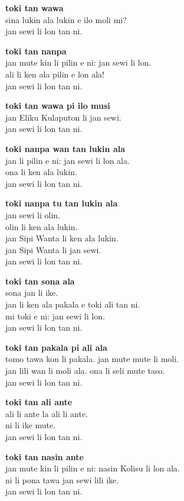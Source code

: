 \textbf{toki tan wawa}   \\
sina lukin ala lukin e ilo moli mi?   \\
jan sewi li lon tan ni.

\textbf{toki tan nanpa}   \\
jan mute kin li pilin e ni: jan sewi li lon.   \\
ali li ken ala pilin e lon ala!   \\
jan sewi li lon tan ni.

\textbf{toki tan wawa pi ilo musi}   \\
jan Eliku Kulaputon li jan sewi.   \\
jan sewi li lon tan ni.

\textbf{toki nanpa wan tan lukin ala }   \\
jan li pilin e ni: jan sewi li lon ala.   \\
ona li ken ala lukin.   \\
jan sewi li lon tan ni.

\textbf{toki nanpa tu tan lukin ala}   \\
jan sewi li olin.   \\
olin li ken ala lukin.   \\
jan Sipi Wanta li ken ala lukin.  \\
jan Sipi Wanta li jan sewi.   \\
jan sewi li lon tan ni.

\textbf{toki tan sona ala}   \\
sona jan li ike.   \\
jan li ken ala pakala e toki ali tan ni.   \\
mi toki e ni: jan sewi li lon.   \\
jan sewi li lon tan ni.

\textbf{toki tan pakala pi ali ala}   \\
tomo tawa kon li pakala. jan mute mute li moli.   \\
jan lili wan li moli ala. ona li seli mute taso.   \\
jan sewi li lon tan ni.

\textbf{toki tan ali ante}   \\
ali li ante la ali li ante.   \\
ni li ike mute.   \\
jan sewi li lon tan ni.

\textbf{toki tan nasin ante}   \\
jan mute kin li pilin e ni: nasin Kolisu li lon ala.       \\
ni li pona tawa jan sewi lili ike.   \\
jan sewi li lon tan ni.

